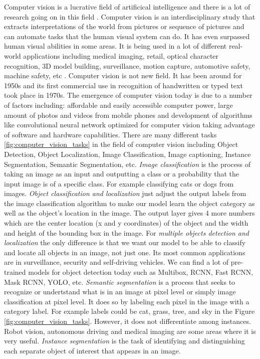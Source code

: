 Computer vision is a lucrative field of artificical intelligence and there is a lot of research going on in this field \cite{Szegedy_2016_CVPR} \cite{wright2010sparse} \cite{vedaldi2010vlfeat}. Computer vision is an interdisciplinary study that extracts interpretations of the world from pictures or sequence of pictures and can automate tasks that the human visual system can do. It has even surpassed human visual abilities in some areas. It is being used in a lot of different real-world applications including medical imaging, retail, optical character recognition, 3D model building, surveillance, motion capture, automotive safety, machine safety, etc \cite{cv_book}. Computer vision is not new field. It has been around for 1950s and its first commercial use in recognition of handwritten or typed text took place in 1970s. The emergence of computer vision today is due to a number of factors including: affordable and easily accessible computer power, large amount of photos and videos from mobile phones and development of algorithms like convolutional neural network optimized for computer vision taking advantage of software and hardware capabilities. There are many different tasks \ref{fig:computer_vision_tasks} in the field of computer vision including Object Detection, Object Localization, Image Classification, Image captioning, Instance Segmentation, Semantic Segmentation, etc. \textit{Image classification} is the process of taking an image as an input and outputting a class or a probability that the input image is of a specific class. For example classifying cats or dogs from images. \textit{Object classification and localization} just adjust the output labels from the image classification algorithm to make our model learn the object category as well as the object's location in the image. The output layer gives 4 more numbers which are the center location (x and y coordinates) of the object and the width and height of the bounding box in the image. For \textit{multiple objects detection and localization} the only difference is that we want our model to be able to classify and locate all objects in an image, not just one. Its most common applications are in surveillance, security and self-driving vehicles. We can find a lot of pre-trained models for object detection today such as Multibox, RCNN, Fast RCNN, Mask RCNN, YOLO, etc. \textit{Semantic segmentation} is a process that seeks to recognize or undertstand what is in an image at pixel level or simply image classification at pixel level. It does so by labeling each pixel in the image with a category label. For example labels could be cat, grass, tree, and sky in the Figure \ref{fig:computer_vision_tasks}. However, it does not differentiate among instances. Robot vision, autonomous driving and medical imaging are some areas where it is very useful. \textit{Instance segmentation} is the task of identifying and distinguishing each separate object of interest that appears in an image.


